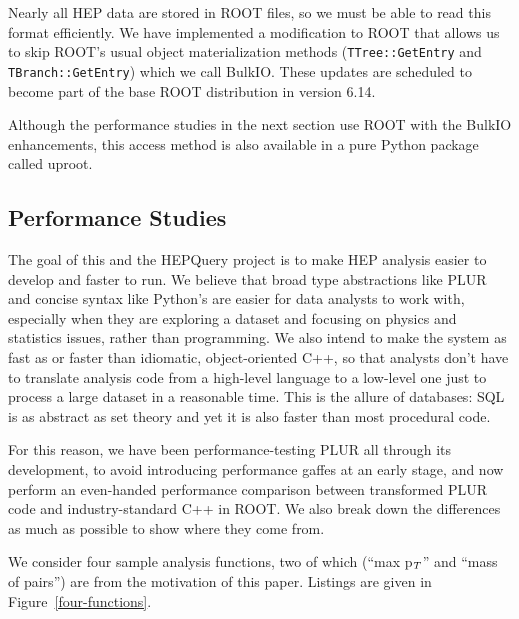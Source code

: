 \documentclass[10pt, conference, compsocconf]{IEEEtran}
\begin{document}
Nearly all HEP data are stored in ROOT files, so we must be able to read this format efficiently. We have implemented a modification to ROOT that allows us to skip ROOT's usual object materialization methods ({\tt TTree::GetEntry} and {\tt TBranch::GetEntry}) which we call BulkIO. These updates are scheduled to become part of the base ROOT distribution in version 6.14.

Although the performance studies in the next section use ROOT with the BulkIO enhancements, this access method is also available in a pure Python package called uproot\cite{uproot}.

\subsection{Performance Studies}







The goal of this and the HEPQuery project is to make HEP analysis easier to develop and faster to run. We believe that broad type abstractions like PLUR and concise syntax like Python's are easier for data analysts to work with, especially when they are exploring a dataset and focusing on physics and statistics issues, rather than programming. We also intend to make the system as fast as or faster than idiomatic, object-oriented C++, so that analysts don't have to translate analysis code from a high-level language to a low-level one just to process a large dataset in a reasonable time. This is the allure of databases: SQL is as abstract as set theory and yet it is also faster than most procedural code.

For this reason, we have been performance-testing PLUR all through its development, to avoid introducing performance gaffes at an early stage, and now perform an even-handed performance comparison between transformed PLUR code and industry-standard C++ in ROOT. We also break down the differences as much as possible to show where they come from.

We consider four sample analysis functions, two of which (``max p$_{\mbox{\scriptsize T}}$'' and ``mass of pairs'') are from the motivation of this paper. Listings are given in Figure~\ref{four-functions}.
\end{document}
